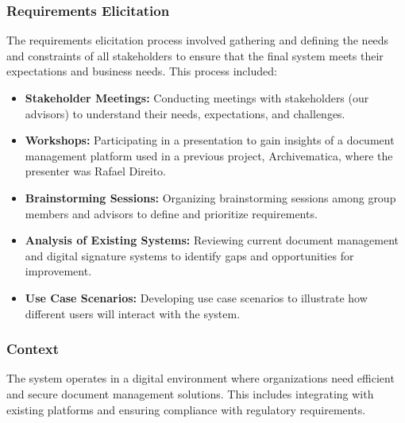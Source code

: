 \documentclass[a4paper,11pt]{article}
\begin{document}
            \subsubsection{Requirements Elicitation}
                The requirements elicitation process involved gathering and defining the needs and constraints of all stakeholders to ensure that the final system meets their expectations and business needs. This process included:
        
                \begin{itemize}
                    \item \textbf{Stakeholder Meetings:} Conducting meetings with stakeholders (our advisors) to understand their needs, expectations, and challenges.
        
                    \item \textbf{Workshops:} Participating in a presentation to gain insights of a document management platform used in a previous project, Archivematica, where the presenter was Rafael Direito.
        
                    \item \textbf{Brainstorming Sessions:} Organizing brainstorming sessions among group members and advisors to define and prioritize requirements.
        
                    \item \textbf{Analysis of Existing Systems:} Reviewing current document management and digital signature systems to identify gaps and opportunities for improvement.
        
                    \item \textbf{Use Case Scenarios:} Developing use case scenarios to illustrate how different users will interact with the system. 
                \end{itemize}
            
            \subsubsection{Context}
                \quad The system operates in a digital environment where organizations need efficient and secure document management solutions. This includes integrating with existing platforms and ensuring compliance with regulatory requirements.

            \pagebreak
\end{document}

